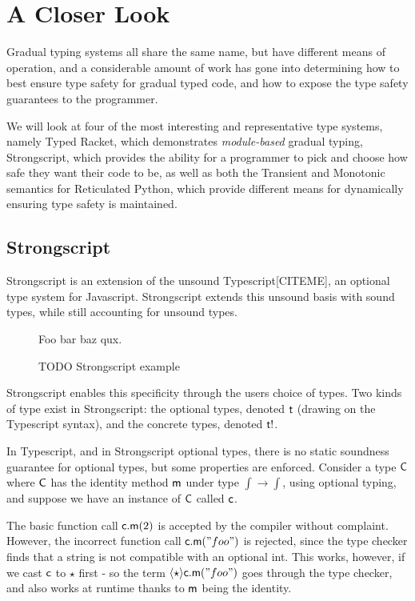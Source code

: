 \documentclass[preprint]{sigplanconf}
\newcommand{\m}{\M{\xt{m}}}
\renewcommand{\t}{\M{\xt{t}}}
\newcommand{\C}{\M{\xt{C}}}
\newcommand{\Cast}[2]{\M{\langle{#1}\rangle{#2}}}
\newcommand{\any}{\M{\star}}
\newcommand{\M}[1]{\ensuremath{#1}\xspace}
\newcommand{\xt}[1]{{\sf{#1}}\xspace}
\begin{document}
\section{A Closer Look}

Gradual typing systems all share the same name, but have different means
of operation, and a considerable amount of work has gone into determining
how to best ensure type safety for gradual typed code, and how to expose
the type safety guarantees to the programmer.

We will look at four of the most interesting and representative type systems,
namely Typed Racket, which demonstrates \emph{module-based} gradual typing,
Strongscript, which provides the ability for a programmer to pick and choose
how safe they want their code to be, as well as both the Transient and
Monotonic semantics for Reticulated Python, which provide different means
for dynamically ensuring type safety is maintained.

\subsection{Strongscript}

Strongscript is an extension of the unsound Typescript[CITEME], an optional
type system for Javascript. Strongscript extends this unsound basis with
sound types, while still accounting for unsound types.

\begin{figure}
Foo bar baz qux.
\caption{TODO Strongscript example}
\label{fig:ssex}
\end{figure}

Strongscript enables this specificity through the users choice of types. 
Two kinds of type exist in Strongscript: the optional types, denoted $\t$
(drawing on the Typescript syntax), and the concrete types, denoted $\t!$.

In Typescript, and in Strongscript optional types, there is no static 
soundness guarantee for optional types, but some properties are enforced.
Consider a type $\C$ where $\C$ has the identity method $\m$ under type 
$\int \rightarrow \int$, using optional typing, and suppose we have an 
instance of $\C$ called $\xt{c}$.

The basic function call $\xt{c}.\m(2)$ is accepted by the compiler without
complaint. However, the incorrect function call $\xt{c}.\m("foo")$ is rejected,
since the type checker finds that a string is not compatible with an optional
int. This works, however, if we cast $\xt{c}$ to $\any$ first - so the term
$\Cast{\any}{\xt{c}}.\m("foo")$ goes through the type checker, and also works
at runtime thanks to $\m$ being the identity.
\end{document}
